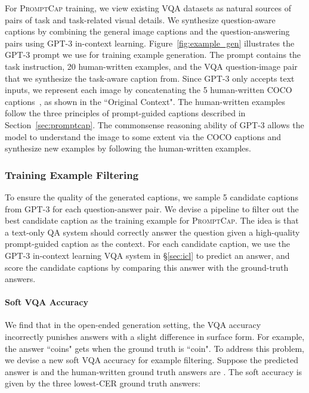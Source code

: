 \documentclass[10pt,twocolumn,letterpaper]{article}
\newcommand{\NAME}{\textsc{PromptCap}\xspace}
\begin{document}
For \NAME training, we view existing VQA datasets as natural sources of pairs of task and task-related visual details.
We synthesize question-aware captions by combining the general image captions and the question-answering pairs using GPT-3 in-context learning.
Figure~\ref{fig:example_gen} illustrates the GPT-3 prompt we use for training example generation.
The prompt contains the task instruction, 20 human-written examples, and the VQA question-image pair that we synthesize the task-aware caption from.
Since GPT-3 only accepts text inputs, we represent each image by concatenating the 5 human-written COCO captions~\cite{chen2015microsoft}, as shown in the ``Original Context". 
The human-written examples follow the three principles of prompt-guided captions described in Section~\ref{sec:promptcap}.
The commonsense reasoning ability of GPT-3 allows the model to understand the image to some extent via the COCO captions and synthesize new examples by following the human-written examples.

\vspace{-0.1in}
\subsubsection{Training Example Filtering}
To ensure the quality of the generated captions, we sample 5 candidate captions from GPT-3 for each question-answer pair.
We devise a pipeline to filter out the best candidate caption as the training example for \NAME.
The idea is that a text-only 
QA system should correctly answer the question given a high-quality prompt-guided caption as the context.
For each candidate caption, we use the GPT-3 in-context learning VQA system in \S\ref{sec:icl} to predict an answer, and score the candidate captions by comparing this answer with the ground-truth answers.

\vspace{-0.1in}
\paragraph{Soft VQA Accuracy} We find that in the open-ended generation setting, the VQA accuracy~\cite{goyal2017making} incorrectly punishes answers with a slight difference in surface form. 
For example, the answer ``coins" gets  when the ground truth is ``coin".
To address this problem, we devise a new soft VQA accuracy for example filtering.
Suppose the predicted answer is  and the human-written ground truth answers are . The soft accuracy is given by 
the three lowest-CER ground truth answers:
\end{document}
